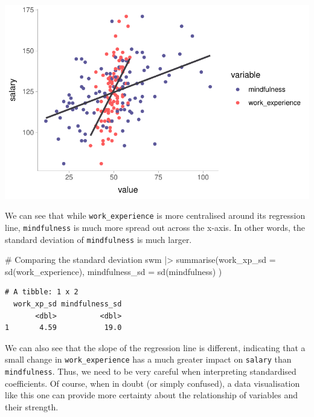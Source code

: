 \documentclass[
  letterpaper,
  DIV=11,
  numbers=noendperiod]{scrreprt}
\newenvironment{Shaded}{\begin{snugshade}}{\end{snugshade}}
\newcommand{\AttributeTok}[1]{\textcolor[rgb]{0.40,0.45,0.13}{#1}}
\newcommand{\CommentTok}[1]{\textcolor[rgb]{0.37,0.37,0.37}{#1}}
\newcommand{\FunctionTok}[1]{\textcolor[rgb]{0.28,0.35,0.67}{#1}}
\newcommand{\NormalTok}[1]{\textcolor[rgb]{0.00,0.23,0.31}{#1}}
\newcommand{\SpecialCharTok}[1]{\textcolor[rgb]{0.37,0.37,0.37}{#1}}
\begin{document}
\includegraphics{13_regressions_files/figure-latex/visualising-swm-regression-1.pdf}

We can see that while \texttt{work\_experience} is more centralised
around its regression line, \texttt{mindfulness} is much more spread out
across the x-axis. In other words, the standard deviation of
\texttt{mindfulness} is much larger.

\begin{Shaded}
\begin{Highlighting}[]
\CommentTok{\# Comparing the standard deviation}
\NormalTok{swm }\SpecialCharTok{|\textgreater{}}
  \FunctionTok{summarise}\NormalTok{(}\AttributeTok{work\_xp\_sd =} \FunctionTok{sd}\NormalTok{(work\_experience),}
            \AttributeTok{mindfulness\_sd =} \FunctionTok{sd}\NormalTok{(mindfulness)}
\NormalTok{            )}
\end{Highlighting}
\end{Shaded}

\begin{verbatim}
# A tibble: 1 x 2
  work_xp_sd mindfulness_sd
       <dbl>          <dbl>
1       4.59           19.0
\end{verbatim}

We can also see that the slope of the regression line is different,
indicating that a small change in \texttt{work\_experience} has a much
greater impact on \texttt{salary} than \texttt{mindfulness}. Thus, we
need to be very careful when interpreting standardised coefficients. Of
course, when in doubt (or simply confused), a data visualisation like
this one can provide more certainty about the relationship of variables
and their strength.
\end{document}
